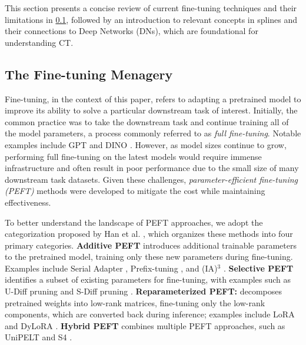 This section presents a concise review of current fine-tuning techniques and their limitations in \cref{sec:finetune}, followed by an introduction to relevant concepts in splines and their connections to Deep Networks (DNs), which are foundational for understanding CT.

\subsection{The Fine-tuning Menagery}\label{sec:finetune}
Fine-tuning, in the context of this paper, refers to adapting a pretrained model to improve its ability to solve a particular downstream task of interest. Initially, the common practice was to take the downstream task and continue training all of the model parameters, a process commonly referred to as \textit{full fine-tuning}. Notable examples include GPT \cite{radford2018gpt} and DINO \cite{caron2021dino}. However, as model sizes continue to grow, performing full fine-tuning on the latest models would require immense infrastructure and often result in poor performance due to the small size of many downstream task datasets. Given these challenges, \textit{parameter-efficient fine-tuning (PEFT)} methods were developed to mitigate the cost while maintaining effectiveness.

To better understand the landscape of PEFT approaches, we adopt the categorization proposed by Han et al. , which organizes these methods into four primary categories. \textbf{Additive PEFT} introduces additional trainable parameters to the pretrained model, training only these new parameters during fine-tuning. Examples include Serial Adapter \cite{houlsby2019serialadapter}, Prefix-tuning \cite{li2021prefixtuning}, and (IA)$^3$ \cite{liu2022ia3}. \textbf{Selective PEFT} identifies a subset of existing parameters for fine-tuning, with examples such as U-Diff pruning and S-Diff pruning \cite{guo2020diffpruning}. \textbf{Reparameterized PEFT:} decomposes pretrained weights into low-rank matrices, fine-tuning only the low-rank components, which are converted back during inference; examples include LoRA \cite{hu2021lora} and DyLoRA \cite{valipour2022dylora}. \textbf{Hybrid PEFT} combines multiple PEFT approaches, such as UniPELT \cite{mao2021unipelt} and S4 \cite{chen2023s4}.

